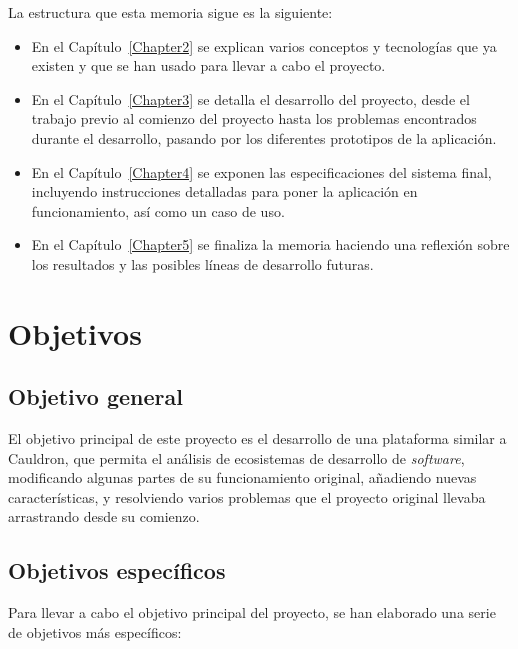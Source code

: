 La estructura que esta memoria sigue es la siguiente:

\begin{itemize}
    \item En el Capítulo~\ref{Chapter2} se explican varios conceptos y tecnologías que ya existen y que se han usado para llevar a cabo el proyecto.
    \item En el Capítulo~\ref{Chapter3} se detalla el desarrollo del proyecto, desde el trabajo previo al comienzo del proyecto hasta los problemas encontrados durante el desarrollo, pasando por los diferentes prototipos de la aplicación.
    \item En el Capítulo~\ref{Chapter4} se exponen las especificaciones del sistema final, incluyendo instrucciones detalladas para poner la aplicación en funcionamiento, así como un caso de uso.
    \item En el Capítulo~\ref{Chapter5} se finaliza la memoria haciendo una reflexión sobre los resultados y las posibles líneas de desarrollo futuras.
\end{itemize}


\section{Objetivos}

\subsection{Objetivo general}

El objetivo principal de este proyecto es el desarrollo de una plataforma similar a Cauldron, que permita el análisis de ecosistemas de desarrollo de \emph{software}, modificando algunas partes de su funcionamiento original, añadiendo nuevas características, y resolviendo varios problemas que el proyecto original llevaba arrastrando desde su comienzo.

\subsection{Objetivos específicos}

Para llevar a cabo el objetivo principal del proyecto, se han elaborado una serie de objetivos más específicos:

